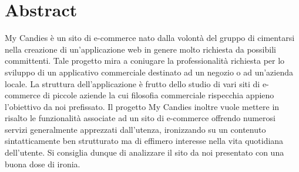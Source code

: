 \section{Abstract} 
My Candies è un sito di e-commerce nato dalla volontà del gruppo di cimentarsi nella creazione di un'applicazione web in genere molto richiesta da possibili committenti. 
Tale progetto mira a coniugare la professionalità richiesta per lo sviluppo di un applicativo commerciale destinato ad un negozio o ad un'azienda locale.
La struttura dell'applicazione è frutto dello studio di vari siti di e-commerce  di piccole aziende  la cui filosofia commerciale rispecchia appieno l'obiettivo da noi prefissato. 
Il progetto My Candies inoltre vuole mettere in risalto le funzionalità associate ad un sito di e-commerce offrendo numerosi servizi generalmente apprezzati dall'utenza, ironizzando su un contenuto sintatticamente ben strutturato ma di effimero interesse nella vita quotidiana dell'utente. Si consiglia dunque di analizzare il sito da noi presentato con una buona dose di ironia.